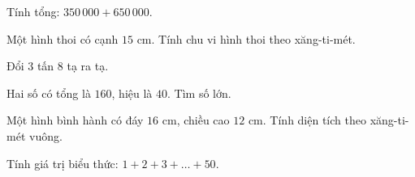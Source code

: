 \begin{ex} %
Tính tổng: $350\,000 + 650\,000$.
\end{ex}

\begin{ex} %
Một hình thoi có cạnh $15\text{ cm}$. Tính chu vi hình thoi theo xăng-ti-mét.
\end{ex}

\begin{ex} %
Đổi $3$ tấn $8$ tạ ra tạ.
\end{ex}

\begin{ex} %
Hai số có tổng là $160$, hiệu là $40$. Tìm số lớn.
\end{ex}

\begin{ex} %
Một hình bình hành có đáy $16\text{ cm}$, chiều cao $12\text{ cm}$. Tính diện tích theo xăng-ti-mét vuông.
\end{ex}

\begin{ex} %
Tính giá trị biểu thức: $1 + 2 + 3 + \dots + 50$.
\end{ex}
